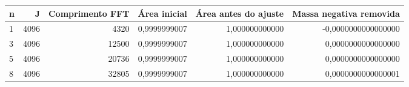 \begin{tabular}{lrrrrr}
\toprule
n & J & Comprimento FFT & Área inicial & Área antes do ajuste & Massa negativa removida \\
\midrule
1 & 4096 & 4320 & 0,9999999007 & 1,000000000000 & -0,0000000000000000 \\
3 & 4096 & 12500 & 0,9999999007 & 1,000000000000 & 0,0000000000000000 \\
5 & 4096 & 20736 & 0,9999999007 & 1,000000000000 & 0,0000000000000000 \\
8 & 4096 & 32805 & 0,9999999007 & 1,000000000000 & 0,0000000000000001 \\
\bottomrule
\end{tabular}
